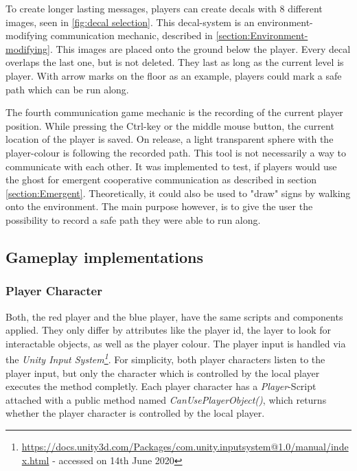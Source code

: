 To create longer lasting messages, players can create decals with 8 different images, seen in \ref{fig:decal selection}. This decal-system is an environment-modifying communication mechanic, described in \ref{section:Environment-modifying}. This images are placed onto the ground below the player. Every decal overlaps the last one, but is not deleted. They last as long as the current level is player. With arrow marks on the floor as an example, players could mark a safe path which can be run along.


The fourth communication game mechanic is the recording of the current player position. While pressing the Ctrl-key or the middle mouse button, the current location of the player is saved. On release, a light transparent sphere with the player-colour is following the recorded path. This tool is not necessarily a way to communicate with each other. It was implemented to test, if players would use the ghost for emergent cooperative communication as described in section \ref{section:Emergent}. Theoretically, it could also be used to "draw" signs by walking onto the environment. The main purpose however, is to give the user the possibility to record a safe path they were able to run along.



\subsection{Gameplay implementations}
\label{section:Gameplay implementations}


\subsubsection{Player Character}

Both, the red player and the blue player, have the same scripts and components applied. They only differ by attributes like the player id, the layer to look for interactable objects, as well as the player colour.
The player input is handled via the \textit{Unity Input System\footnote{\url{https://docs.unity3d.com/Packages/com.unity.inputsystem@1.0/manual/index.html} - accessed on 14th June 2020}}. For simplicity, both player characters listen to the player input, but only the character which is controlled by the local player executes the method completly.
Each player character has a \textit{Player}-Script attached with a public method named \textit{CanUsePlayerObject()}, which returns whether the player character is controlled by the local player.

